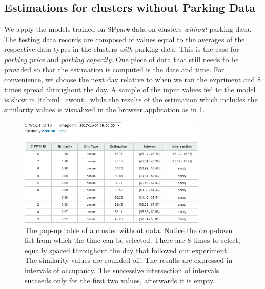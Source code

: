 \documentclass{ws-ijait}
\begin{document}
		\subsection{Estimations for clusters without Parking Data}
		We apply the models trained on SF\textit{park} data on clusters \textit{without} parking data.
		The testing data records are composed of values equal to the averages of the respective data types in the clusters \textit{with} parking data.
		This is the case for \textit{parking price} and \textit{parking capacity}.
		One piece of data that still needs to be provided so that the estimation is computed is the date and time.
		For convenience, we choose the next day relative to when we ran the expriment and 8 times spread throughout the day.
		A sample of the input values fed to the model is show in \cref{tab:ml_cwout}, while the results of the estimation which includes the similarity values is visualized in the browser application as in \cref{fig:cwout_table}.
		
		\begin{figure}[!ht]
			\centering
			\includegraphics[width=0.8\textwidth]{../graphics/cwout_cosine_table.png}
			\caption{The pop-up table of a cluster without data.
				Notice the drop-down list from which the time can be selected. There are 8 times to select, equally spaced throughout the day that followed our experiment. The similarity values are rounded off. The results are expressed in intervals of occupancy. The successive intersection of intervals succeeds only for the first two values, afterwards it is empty.}
			\label{fig:cwout_table}
		\end{figure}
		
\end{document}

